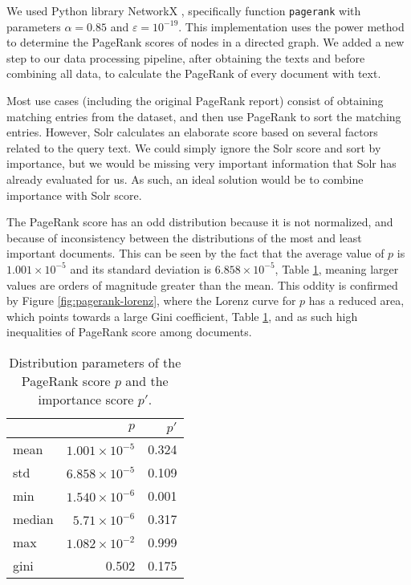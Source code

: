 \documentclass[sigconf, authorversion]{acmart}
\begin{document}
We used Python library NetworkX \cite{networkx}, specifically function \texttt{pagerank} \cite{networkx-pagerank} with parameters $\alpha=0.85$ and $\varepsilon=10^{-19}$. This implementation uses the power method to determine the PageRank scores of nodes in a directed graph. We added a new step to our data processing pipeline, after obtaining the texts and before combining all data, to calculate the PageRank of every document with text.

Most use cases (including the original PageRank report) consist of obtaining matching entries from the dataset, and then use PageRank to sort the matching entries. However, Solr calculates an elaborate score based on several factors related to the query text. We could simply ignore the Solr score and sort by importance, but we would be missing very important information that Solr has already evaluated for us. As such, an ideal solution would be to combine importance with Solr score.

The PageRank score has an odd distribution because it is not normalized, and because of inconsistency between the distributions of the most and least important documents. This can be seen by the fact that the average value of $p$ is $1.001 \times 10^{-5}$ and its standard deviation is $6.858 \times 10^{-5}$, Table \ref{tab:pagerank}, meaning larger values are orders of magnitude greater than the mean. This oddity is confirmed by Figure \ref{fig:pagerank-lorenz}, where the Lorenz curve for $p$ has a reduced area, which points towards a large Gini coefficient, Table \ref{tab:pagerank}, and as such high inequalities of PageRank score among documents.

\begin{table}[t]
    \centering
    \caption{Distribution parameters of the PageRank score $p$ and the importance score $p'$.} \label{tab:pagerank}
    \begin{tabular}{@{}l|r|r@{}}
                & \textbf{$p$}              & \textbf{$p'$} \\ \hline
        mean    & $1.001 \times 10^{-5}$    & 0.324         \\
        std     & $6.858 \times 10^{-5}$    & 0.109         \\
        min     & $1.540 \times 10^{-6}$    & 0.001         \\
        median  & $5.71 \times 10^{-6}$     & 0.317         \\
        max     & $1.082 \times 10^{-2}$    & 0.999         \\
        gini    & 0.502                     & 0.175         \\
    \end{tabular}
\end{table}
\end{document}
